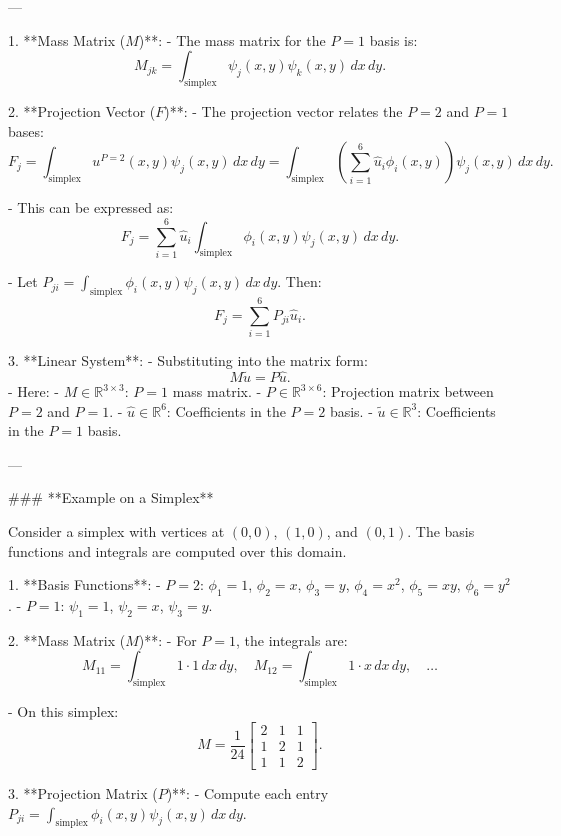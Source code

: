 ---

1. **Mass Matrix (\( M \))**:
   - The mass matrix for the \( P=1 \) basis is:
     \[
     M_{jk} = \int_\text{simplex} \psi_j(x, y) \psi_k(x, y) \, dx\,dy.
     \]

2. **Projection Vector (\( F \))**:
   - The projection vector relates the \( P=2 \) and \( P=1 \) bases:
     \[
     F_j = \int_\text{simplex} u^{P=2}(x, y) \psi_j(x, y) \, dx\,dy = \int_\text{simplex} \left( \sum_{i=1}^6 \hat{u}_i \phi_i(x, y) \right) \psi_j(x, y) \, dx\,dy.
     \]

   - This can be expressed as:
     \[
     F_j = \sum_{i=1}^6 \hat{u}_i \int_\text{simplex} \phi_i(x, y) \psi_j(x, y) \, dx\,dy.
     \]

   - Let \( P_{ji} = \int_\text{simplex} \phi_i(x, y) \psi_j(x, y) \, dx\,dy \). Then:
     \[
     F_j = \sum_{i=1}^6 P_{ji} \hat{u}_i.
     \]

3. **Linear System**:
   - Substituting into the matrix form:
     \[
     M \tilde{u} = P \hat{u}.
     \]
   - Here:
     - \( M \in \mathbb{R}^{3 \times 3} \): \( P=1 \) mass matrix.
     - \( P \in \mathbb{R}^{3 \times 6} \): Projection matrix between \( P=2 \) and \( P=1 \).
     - \( \hat{u} \in \mathbb{R}^6 \): Coefficients in the \( P=2 \) basis.
     - \( \tilde{u} \in \mathbb{R}^3 \): Coefficients in the \( P=1 \) basis.

---

### **Example on a Simplex**

Consider a simplex with vertices at \((0,0)\), \((1,0)\), and \((0,1)\). The basis functions and integrals are computed over this domain.

1. **Basis Functions**:
   - \( P=2 \): \(\phi_1 = 1\), \(\phi_2 = x\), \(\phi_3 = y\), \(\phi_4 = x^2\), \(\phi_5 = xy\), \(\phi_6 = y^2\).
   - \( P=1 \): \(\psi_1 = 1\), \(\psi_2 = x\), \(\psi_3 = y\).

2. **Mass Matrix (\( M \))**:
   - For \( P=1 \), the integrals are:
     \[
     M_{11} = \int_\text{simplex} 1 \cdot 1 \, dx\,dy, \quad M_{12} = \int_\text{simplex} 1 \cdot x \, dx\,dy, \quad \dots
     \]

   - On this simplex:
     \[
     M = \frac{1}{24} \begin{bmatrix}
     2 & 1 & 1 \\
     1 & 2 & 1 \\
     1 & 1 & 2
     \end{bmatrix}.
     \]

3. **Projection Matrix (\( P \))**:
   - Compute each entry \( P_{ji} = \int_\text{simplex} \phi_i(x, y) \psi_j(x, y) \, dx\,dy \).


